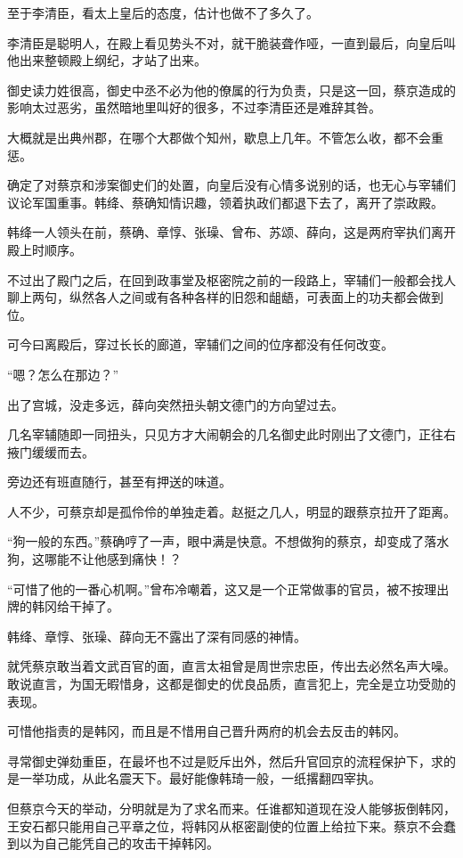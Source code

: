 至于李清臣，看太上皇后的态度，估计也做不了多久了。

李清臣是聪明人，在殿上看见势头不对，就干脆装聋作哑，一直到最后，向皇后叫他出来整顿殿上纲纪，才站了出来。

御史读力姓很高，御史中丞不必为他的僚属的行为负责，只是这一回，蔡京造成的影响太过恶劣，虽然暗地里叫好的很多，不过李清臣还是难辞其咎。

大概就是出典州郡，在哪个大郡做个知州，歇息上几年。不管怎么收，都不会重惩。

确定了对蔡京和涉案御史们的处置，向皇后没有心情多说别的话，也无心与宰辅们议论军国重事。韩绛、蔡确知情识趣，领着执政们都退下去了，离开了崇政殿。

韩绛一人领头在前，蔡确、章惇、张璪、曾布、苏颂、薛向，这是两府宰执们离开殿上时顺序。

不过出了殿门之后，在回到政事堂及枢密院之前的一段路上，宰辅们一般都会找人聊上两句，纵然各人之间或有各种各样的旧怨和龃龉，可表面上的功夫都会做到位。

可今曰离殿后，穿过长长的廊道，宰辅们之间的位序都没有任何改变。

“嗯？怎么在那边？”

出了宫城，没走多远，薛向突然扭头朝文德门的方向望过去。

几名宰辅随即一同扭头，只见方才大闹朝会的几名御史此时刚出了文德门，正往右掖门缓缓而去。

旁边还有班直随行，甚至有押送的味道。

人不少，可蔡京却是孤伶伶的单独走着。赵挺之几人，明显的跟蔡京拉开了距离。

“狗一般的东西。”蔡确哼了一声，眼中满是快意。不想做狗的蔡京，却变成了落水狗，这哪能不让他感到痛快！？

“可惜了他的一番心机啊。”曾布冷嘲着，这又是一个正常做事的官员，被不按理出牌的韩冈给干掉了。

韩绛、章惇、张璪、薛向无不露出了深有同感的神情。

就凭蔡京敢当着文武百官的面，直言太祖曾是周世宗忠臣，传出去必然名声大噪。敢说直言，为国无暇惜身，这都是御史的优良品质，直言犯上，完全是立功受勋的表现。

可惜他指责的是韩冈，而且是不惜用自己晋升两府的机会去反击的韩冈。

寻常御史弹劾重臣，在最坏也不过是贬斥出外，然后升官回京的流程保护下，求的是一举功成，从此名震天下。最好能像韩琦一般，一纸撂翻四宰执。

但蔡京今天的举动，分明就是为了求名而来。任谁都知道现在没人能够扳倒韩冈，王安石都只能用自己平章之位，将韩冈从枢密副使的位置上给拉下来。蔡京不会蠢到以为自己能凭自己的攻击干掉韩冈。

